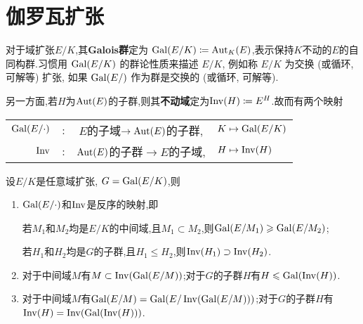 \section{伽罗瓦扩张}
\begin{definition}
	对于域扩张$E/K$,其\textbf{Galois群}定为 $\Gal(E/K) \coloneqq \Aut_K(E)$,表示保持$K$不动的$E$的自同构群.习惯用 $\Gal(E/K)$ 的群论性质来描述 $E/K$, 例如称 $E/K$ 为交换 (或循环, 可解等) 扩张, 如果 $\Gal(E/)$ 作为群是交换的 (或循环, 可解等).
	
	另一方面,若$H$为$\Aut(E)$的子群,则其\textbf{不动域}定为$\Inv(H)\coloneqq E^H$.故而有两个映射
	\begin{center}
		\begin{tabular}{rccl}
			$\Gal(E/\cdot)$&:&$E$的子域$\to\Aut(E)$的子群,&$K\mapsto \Gal(E/K)$\\
			$\Inv$&:&$\Aut(E)$的子群$\to E$的子域,&$H\mapsto\Inv(H)$\\
		\end{tabular}
	\end{center}
\end{definition}
\begin{proposition}
	设$E/K$是任意域扩张, $G=\Gal(E/K)$,则
	\begin{enumerate}
		\item $\Gal(E/\cdot)$和$\Inv$是反序的映射,即
		
		若$M_1$和$M_2$均是$E/K$的中间域,且$M_1\subset M_2$,则$\Gal(E/M_1)\geqslant\Gal(E/M_2)$;
		
		若$H_1$和$H_2$均是$G$的子群,且$H_1\leqslant H_2$,则$\Inv(H_1)\supset\Inv(H_2)$.
		\item 对于中间域$M$有$M\subset\Inv(\Gal(E/M))$;对于$G$的子群$H$有$H\leqslant\Gal(\Inv(H))$.
		\item 对于中间域$M$有$\Gal(E/M)=\Gal(E/\Inv(\Gal(E/M)))$;对于$G$的子群$H$有$\Inv(H)=\Inv(\Gal(\Inv(H)))$.
	\end{enumerate}
\end{proposition}

